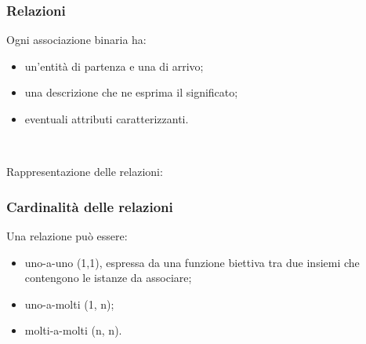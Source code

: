 \documentclass[]{beamer}
\begin{document}
\begin{frame}
\frametitle{Relazioni}
Ogni associazione \alert<1>{binaria} ha:
\begin{itemize}
  \item un'entità di partenza e una di arrivo;\pause
  \item una descrizione che ne esprima il significato;\pause
  \item eventuali attributi caratterizzanti.\pause
\end{itemize}

~

Rappresentazione delle relazioni:
\end{frame}


\begin{frame}
\frametitle{Cardinalità delle relazioni}
Una relazione può essere:
\begin{itemize}
  \item \alert<1>{uno-a-uno (1,1)}, espressa da una funzione biettiva tra due insiemi che contengono le istanze da associare;\pause
  \item \alert<2>{uno-a-molti (1, n)};
  \pause
  \item \alert<3>{molti-a-molti (n, n)}.
\end{itemize}
\end{frame}
\end{document}

